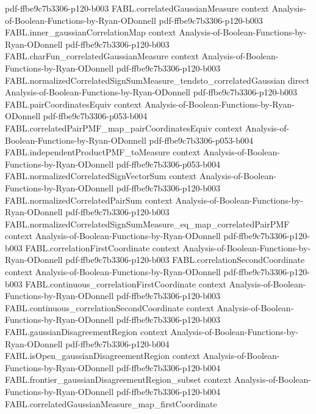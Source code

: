 \begin{theorem}
  {pdf-ffbe9c7b3306-p120-b003}
\proofstep
  {FABL.correlatedGaussianMeasure}
  {context}
  {Analysis-of-Boolean-Functions-by-Ryan-ODonnell}
  {pdf-ffbe9c7b3306-p120-b003}
\proofstep
  {FABL.inner_gaussianCorrelationMap}
  {context}
  {Analysis-of-Boolean-Functions-by-Ryan-ODonnell}
  {pdf-ffbe9c7b3306-p120-b003}
\proofstep
  {FABL.charFun_correlatedGaussianMeasure}
  {context}
  {Analysis-of-Boolean-Functions-by-Ryan-ODonnell}
  {pdf-ffbe9c7b3306-p120-b003}
\proofstep
  {FABL.normalizedCorrelatedSignSumMeasure_tendsto_correlatedGaussian}
  {direct}
  {Analysis-of-Boolean-Functions-by-Ryan-ODonnell}
  {pdf-ffbe9c7b3306-p120-b003}
\proofstep
  {FABL.pairCoordinatesEquiv}
  {context}
  {Analysis-of-Boolean-Functions-by-Ryan-ODonnell}
  {pdf-ffbe9c7b3306-p053-b004}
\proofstep
  {FABL.correlatedPairPMF_map_pairCoordinatesEquiv}
  {context}
  {Analysis-of-Boolean-Functions-by-Ryan-ODonnell}
  {pdf-ffbe9c7b3306-p053-b004}
\proofstep
  {FABL.independentProductPMF_toMeasure}
  {context}
  {Analysis-of-Boolean-Functions-by-Ryan-ODonnell}
  {pdf-ffbe9c7b3306-p053-b004}
\proofstep
  {FABL.normalizedCorrelatedSignVectorSum}
  {context}
  {Analysis-of-Boolean-Functions-by-Ryan-ODonnell}
  {pdf-ffbe9c7b3306-p120-b003}
\proofstep
  {FABL.normalizedCorrelatedPairSum}
  {context}
  {Analysis-of-Boolean-Functions-by-Ryan-ODonnell}
  {pdf-ffbe9c7b3306-p120-b003}
\proofstep
  {FABL.normalizedCorrelatedSignSumMeasure_eq_map_correlatedPairPMF}
  {context}
  {Analysis-of-Boolean-Functions-by-Ryan-ODonnell}
  {pdf-ffbe9c7b3306-p120-b003}
\proofstep
  {FABL.correlationFirstCoordinate}
  {context}
  {Analysis-of-Boolean-Functions-by-Ryan-ODonnell}
  {pdf-ffbe9c7b3306-p120-b003}
\proofstep
  {FABL.correlationSecondCoordinate}
  {context}
  {Analysis-of-Boolean-Functions-by-Ryan-ODonnell}
  {pdf-ffbe9c7b3306-p120-b003}
\proofstep
  {FABL.continuous_correlationFirstCoordinate}
  {context}
  {Analysis-of-Boolean-Functions-by-Ryan-ODonnell}
  {pdf-ffbe9c7b3306-p120-b003}
\proofstep
  {FABL.continuous_correlationSecondCoordinate}
  {context}
  {Analysis-of-Boolean-Functions-by-Ryan-ODonnell}
  {pdf-ffbe9c7b3306-p120-b003}
\proofstep
  {FABL.gaussianDisagreementRegion}
  {context}
  {Analysis-of-Boolean-Functions-by-Ryan-ODonnell}
  {pdf-ffbe9c7b3306-p120-b004}
\proofstep
  {FABL.isOpen_gaussianDisagreementRegion}
  {context}
  {Analysis-of-Boolean-Functions-by-Ryan-ODonnell}
  {pdf-ffbe9c7b3306-p120-b004}
\proofstep
  {FABL.frontier_gaussianDisagreementRegion_subset}
  {context}
  {Analysis-of-Boolean-Functions-by-Ryan-ODonnell}
  {pdf-ffbe9c7b3306-p120-b004}
\proofstep
  {FABL.correlatedGaussianMeasure_map_firstCoordinate}

\end{theorem}
